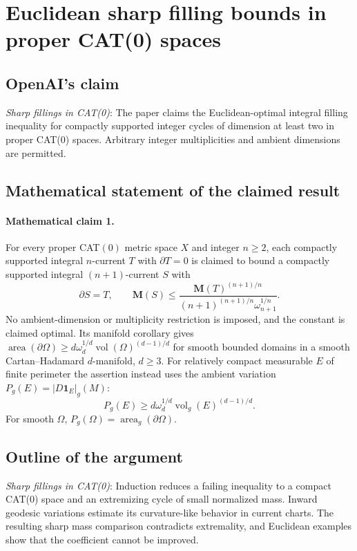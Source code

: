 \documentclass[11pt]{article}
\begin{document}
\section*{Euclidean sharp filling bounds in proper CAT(0) spaces}

\subsection{OpenAI's claim}
\textit{Sharp fillings in CAT(0)}: The paper claims the Euclidean-optimal integral filling inequality for compactly supported integer cycles of dimension at least two in proper CAT(0) spaces. Arbitrary integer multiplicities and ambient dimensions are permitted.

\subsection{Mathematical statement of the claimed result}
\paragraph{Mathematical claim 1.} For every proper CAT$(0)$ metric space $X$ and integer $n\ge2$, each compactly supported integral $n$-current $T$ with $\partial T=0$ is claimed to bound a compactly supported integral $(n+1)$-current $S$ with \[\partial S=T,\qquad\mathbf M(S)\le\frac{\mathbf M(T)^{(n+1)/n}}{(n+1)^{(n+1)/n}\omega_{n+1}^{1/n}}.\] No ambient-dimension or multiplicity restriction is imposed, and the constant is claimed optimal. Its manifold corollary gives $\operatorname{area}(\partial\Omega)\ge d\omega_d^{1/d}\operatorname{vol}(\Omega)^{(d-1)/d}$ for smooth bounded domains in a smooth Cartan--Hadamard $d$-manifold, $d\ge3$. For relatively compact measurable $E$ of finite perimeter the assertion instead uses the ambient variation $P_g(E)=|D\mathbf1_E|_g(M)$: \[P_g(E)\ge d\omega_d^{1/d}\operatorname{vol}_g(E)^{(d-1)/d}.\] For smooth $\Omega$, $P_g(\Omega)=\operatorname{area}_g(\partial\Omega)$.

\subsection{Outline of the argument}
\textit{Sharp fillings in CAT(0)}: Induction reduces a failing inequality to a compact CAT(0) space and an extremizing cycle of small normalized mass. Inward geodesic variations estimate its curvature-like behavior in current charts. The resulting sharp mass comparison contradicts extremality, and Euclidean examples show that the coefficient cannot be improved.
\end{document}
